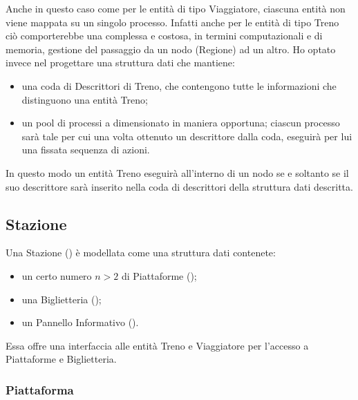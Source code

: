 	Anche in questo caso come per le entità di tipo Viaggiatore, ciascuna entità non viene mappata su un singolo processo. Infatti anche per le entità di tipo Treno ciò comporterebbe una complessa e costosa, in termini computazionali e di memoria, gestione del passaggio da un nodo (Regione) ad un altro. Ho optato invece nel progettare una struttura dati  che mantiene:
		\begin{itemize}
			\item una coda di Descrittori di Treno, che contengono tutte le informazioni che distinguono una entità Treno;
			\item un pool di processi a dimensionato in maniera opportuna; ciascun processo sarà tale per cui una volta ottenuto un descrittore dalla coda, eseguirà per lui una fissata sequenza di azioni.
		\end{itemize}
	In questo modo un entità Treno eseguirà all'interno di un nodo se e soltanto se il suo descrittore sarà inserito nella coda di descrittori della struttura dati descritta.
				
	\subsection{Stazione} \label{subsec:station}
	
	Una Stazione () è modellata come una struttura dati contenete:
		\begin{itemize}
			\item un certo numero $ n > 2$ di Piattaforme ();
			\item una Biglietteria ();
			\item un Pannello Informativo ().
		\end{itemize}
	Essa offre una interfaccia alle entità Treno e Viaggiatore per l'accesso a Piattaforme e Biglietteria.
		
		\subsubsection{Piattaforma}
	
